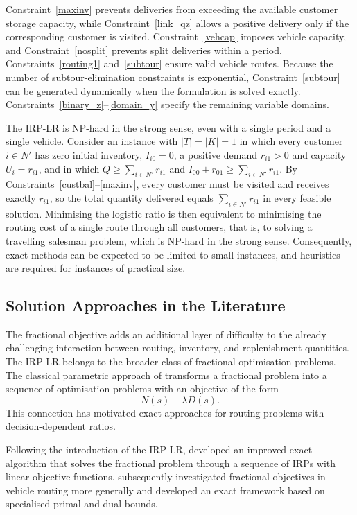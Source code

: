\documentclass{article}
\begin{document}
Constraint~\eqref{maxinv} prevents deliveries from exceeding the available
customer storage capacity, while Constraint~\eqref{link_qz} allows a positive
delivery only if the corresponding customer is visited.
Constraint~\eqref{vehcap} imposes vehicle capacity, and
Constraint~\eqref{nosplit} prevents split deliveries within a period.
Constraints~\eqref{routing1} and~\eqref{subtour} ensure valid vehicle routes.
Because the number of subtour-elimination constraints is exponential,
Constraint~\eqref{subtour} can be generated dynamically when the formulation
is solved exactly. Constraints~\eqref{binary_z}--\eqref{domain_y} specify the
remaining variable domains.

The IRP-LR is NP-hard in the strong sense, even with a single period and a
single vehicle. Consider an instance with $|T|=|K|=1$ in which every customer
$i\in N'$ has zero initial inventory, $I_{i0}=0$, a positive demand $r_{i1}>0$
and capacity $U_i=r_{i1}$, and in which $Q\geq\sum_{i\in N'}r_{i1}$ and
$I_{00}+r_{01}\geq\sum_{i\in N'}r_{i1}$. By
Constraints~\eqref{custbal}--\eqref{maxinv}, every customer must be visited
and receives exactly $r_{i1}$, so the total quantity delivered equals
$\sum_{i\in N'}r_{i1}$ in every feasible solution. Minimising the logistic
ratio is then equivalent to minimising the routing cost of a single route
through all customers, that is, to solving a travelling salesman problem,
which is NP-hard in the strong sense. Consequently, exact methods can be
expected to be limited to small instances, and heuristics are required for
instances of practical size.


\subsection{Solution Approaches in the Literature}
\label{sec:related_solution_methods}

The fractional objective adds an additional layer of difficulty to the
already challenging interaction between routing, inventory, and replenishment
quantities. The IRP-LR belongs to the broader class of fractional optimisation
problems. The classical parametric approach of \cite{dinkelbach1967}
transforms a fractional problem into a sequence of optimisation problems with
an objective of the form
\[
N(s)-\lambda D(s).
\]
This connection has motivated exact approaches for routing problems with
decision-dependent ratios.

Following the introduction of the IRP-LR,
\cite{archetti2019exact} developed an improved exact algorithm that solves
the fractional problem through a sequence of IRPs with linear objective
functions. \cite{baldacci2020fractional} subsequently investigated
fractional objectives in vehicle routing more generally and developed an
exact framework based on specialised primal and dual bounds.
\end{document}
